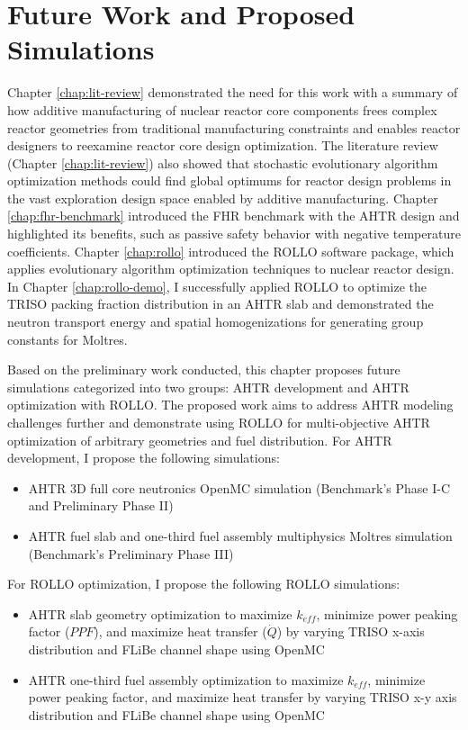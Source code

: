 \chapter{Future Work and Proposed Simulations}

Chapter \ref{chap:lit-review} demonstrated the need for this work with a summary
of how additive manufacturing of nuclear reactor core components frees complex 
reactor geometries from traditional manufacturing constraints and enables 
reactor designers to reexamine reactor core design optimization.
The literature review (Chapter \ref{chap:lit-review}) also showed that 
stochastic evolutionary algorithm optimization methods could find global 
optimums for reactor design problems in the vast exploration design space 
enabled by additive manufacturing. 
Chapter \ref{chap:fhr-benchmark} introduced the \acrfull{FHR} benchmark with 
the \gls{AHTR} design and highlighted its benefits, such as passive safety 
behavior with negative temperature coefficients. 
Chapter \ref{chap:rollo} introduced the \acrfull{ROLLO} software package, 
which applies evolutionary algorithm optimization techniques to nuclear 
reactor design. 
In Chapter \ref{chap:rollo-demo}, I successfully applied \gls{ROLLO} 
to optimize the \gls{TRISO} packing fraction distribution in an \gls{AHTR} slab
and demonstrated the neutron transport energy and spatial homogenizations for 
generating group constants for Moltres. 

Based on the preliminary work conducted, this chapter proposes 
future simulations categorized into two groups: \gls{AHTR} development and 
\gls{AHTR} optimization with \gls{ROLLO}. 
The proposed work aims to address \gls{AHTR} modeling challenges further and 
demonstrate using \gls{ROLLO} for multi-objective \gls{AHTR} 
optimization of arbitrary geometries and fuel distribution. 
For \gls{AHTR} development, I propose the following simulations: 
\begin{itemize}
    \item \gls{AHTR} 3D full core neutronics OpenMC simulation (Benchmark's Phase I-C and 
    Preliminary Phase II)
    \item \gls{AHTR} fuel slab and one-third fuel assembly multiphysics 
    Moltres simulation (Benchmark's Preliminary Phase III)
\end{itemize}
For \gls{ROLLO} optimization, I propose the following \gls{ROLLO} simulations: 
\begin{itemize}
    \item \gls{AHTR} slab geometry optimization to maximize $k_{eff}$, 
    minimize power peaking factor ($PPF$), and maximize heat transfer ($\dot{Q}$) 
    by varying \gls{TRISO} x-axis distribution and \gls{FLiBe} channel shape using OpenMC
    \item \gls{AHTR} one-third fuel assembly optimization to maximize $k_{eff}$, 
    minimize power peaking factor, and maximize heat transfer by varying \gls{TRISO} 
    x-y axis distribution and \gls{FLiBe} channel shape using OpenMC
\end{itemize}

